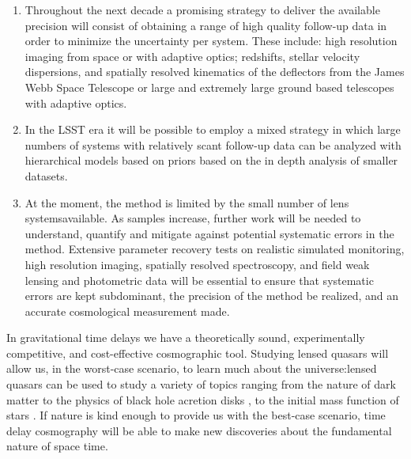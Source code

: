 \begin{enumerate}
%
\item Throughout the next decade a promising strategy to deliver the
available precision will consist of obtaining a range of high quality
follow-up data in order to minimize the uncertainty per system. These
include: high resolution imaging from space or with adaptive optics;
redshifts, stellar velocity dispersions, and spatially resolved
kinematics of the deflectors from the James Webb Space Telescope or
large and extremely large ground based telescopes with adaptive
optics.
%
\item  In the LSST era it will be possible to employ a mixed strategy 
in which large numbers of systems with relatively scant follow-up data
can be analyzed with hierarchical models based on priors based on the
in depth analysis of smaller datasets.
%
\item  At the moment, the method is limited by the small number of lens 
systemsavailable. As samples increase, further work will be needed to
understand, quantify and mitigate against potential systematic errors
in the method. Extensive parameter recovery tests on realistic
simulated monitoring, high resolution imaging, spatially resolved
spectroscopy, and field weak lensing and photometric data will be
essential to ensure that systematic errors are kept subdominant, the
precision of the method be realized, and an accurate cosmological
measurement made.
\end{enumerate}


%
%
In gravitational time delays we have a theoretically sound,
experimentally competitive, and cost-effective cosmographic tool.
%
Studying lensed
quasars will allow us, in the worst-case scenario, to learn much about
the universe:lensed quasars can be used to study a variety of topics
ranging from the nature of dark matter
\citep{Metcalf:2005p1203,Xu++09,Veg++14,Nie++14} to the physics of
black hole acretion disks \citep{PMK08,Blackburne:2010p6600}, to the
initial mass function of stars \citep{Sch++14}. If nature is kind
enough to provide us with the best-case scenario, time delay cosmography
will be able to
make new discoveries about the fundamental nature of space time.
